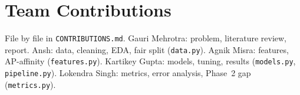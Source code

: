 \section*{Team Contributions}
File by file in \texttt{CONTRIBUTIONS.md}. Gauri Mehrotra: problem, literature
review, report. Ansh: data, cleaning, EDA, fair split (\texttt{data.py}).
Agnik Misra: features, AP-affinity (\texttt{features.py}). Kartikey Gupta:
models, tuning, results (\texttt{models.py}, \texttt{pipeline.py}). Lokendra
Singh: metrics, error analysis, Phase~2 gap (\texttt{metrics.py}).
